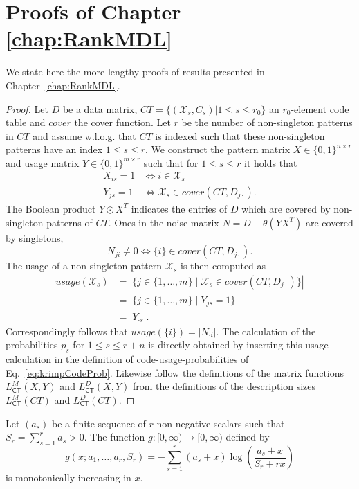 \chapter{Proofs of Chapter \ref{chap:RankMDL}}\label{chap:AppendixMDL}
We state here the more lengthy proofs of results presented in Chapter~\ref{chap:RankMDL}.
\lctbmf*
\begin{proof}
Let $D$ be a data matrix, $CT=\{(\mathcal{X}_s,C_s)|1\leq  s\leq r_0\}$ an $r_0$-element code table and $cover$ the cover function. Let $r$ be the number of non-singleton patterns in $CT$ and assume w.l.o.g. that $CT$ is indexed such that these non-singleton patterns have an index $1\leq s \leq r$. We construct the pattern matrix $X\in \{0,1\}^{n\times r}$ and usage matrix $Y\in \{0,1\}^{m\times r}$ such that for $1\leq s\leq r$ it holds that
\begin{align*}
X_{is}=1&\Leftrightarrow i\in \mathcal{X}_s\\
Y_{js}=1&\Leftrightarrow \mathcal{X}_s\in cover(CT,D_{j\cdot}).
\end{align*}
The Boolean product $Y\odot X^T$ indicates the entries of $D$ which are covered by non-singleton patterns of $CT$. Ones in the noise matrix $N=D-\theta(YX^T)$ are covered by singletons, 
\[N_{ji}\neq 0\Leftrightarrow \{i\}\in cover(CT,D_{j\cdot}).\]
The usage of a non-singleton pattern $\mathcal{X}_s$ is then computed as
\begin{align*}
usage(\mathcal{X}_s)&=|\{j\in\{1,\ldots,m\}\mid \mathcal{X}_s\in cover(CT,D_{j\cdot})\}|\\
&=|\{j\in\{1,\ldots,m\}\mid Y_{js}=1\}|\\
&=|Y_{\cdot s}|.
\end{align*}
Correspondingly follows that $usage(\{i\})=|N_{\cdot i}|$. The calculation of the probabilities $p_s$ for $1\leq s \leq r+n$ is directly obtained by inserting this usage calculation in the definition of code-usage-probabilities of Eq.~\eqref{eq:krimpCodeProb}. Likewise follow the definitions of the matrix functions $L_{\mathsf{CT}}^M(X,Y)$ and $L_{\mathsf{CT}}^D(X,Y)$ from the definitions of the description sizes $L_{\mathsf{CT}}^M(CT)$ and $L_{\mathsf{CT}}^D(CT)$.
\end{proof}
\begin{lemma}\label{thm:monoticity}
Let $(a_s)$ be a finite sequence of $r$ non-negative scalars such that $S_r=\sum_{s=1}^ra_s>0$. The function $g:[0,\infty)\rightarrow[0,\infty)$ defined by
\[g(x;a_1,\ldots,a_r,S_r)=-\sum_{s=1}^r(a_s+x)\log\left(\frac{a_s+x}{S_r+rx}\right)\]
is monotonically increasing in $x$.
\end{lemma}

